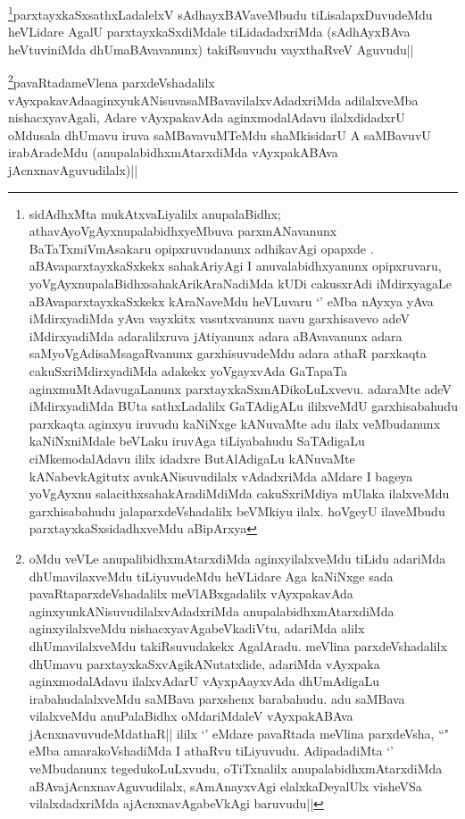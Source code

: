 \begin{artha}
\footnote{sidAdhxMta mukAtxvaLiyalilx anupalaBidhx; athavAyoVgAyxnupalabidhxyeMbuva parxmANavanunx BaTaTxmiVmAsakaru opipxruvudanunx adhikavAgi opapxde . aBAvaparxtayxkaSxkekx sahakAriyAgi I anuvalabidhxyanunx opipxruvaru, yoVgAyxnupalaBidhxsahakArikAraNadiMda kUDi cakusxrAdi iMdirxyagaLe aBAvaparxtayxkaSxkekx  kAraNaveMdu heVLuvaru `\stext' eMba nAyxya yAva iMdirxyadiMda yAva vayxkitx vasutxvanunx navu garxhisavevo adeV iMdirxyadiMda adaralilxruva jAtiyanunx adara aBAvavanunx adara saMyoVgAdisaMsagaRvanunx garxhisuvudeMdu adara athaR parxkaqta cakuSxriMdirxyadiMda adakekx yoVgayxvAda GaTapaTa aginxmuMtAdavugaLanunx parxtayxkaSxmADikoLuLxvevu. adaraMte adeV iMdirxyadiMda BUta sathxLadalilx GaTAdigALu ililxveMdU garxhisabahudu parxkaqta aginxyu iruvudu kaNiNxge kANuvaMte adu ilalx veMbudanunx kaNiNxniMdale beVLaku iruvAga tiLiyabahudu  SaTAdigaLu ciMkemodalAdavu ililx idadxre ButAlAdigaLu kANuvaMte kANabevkAgitutx avukANisuvudilalx vAdadxriMda aMdare I bageya yoVgAyxnu salacithxsahakAradiMdiMda cakuSxriMdiya mUlaka ilalxveMdu garxhisabahudu jalaparxdeVshadalilx beVMkiyu ilalx. hoVgeyU ilaveMbudu parxtayxkaSxsidadhxveMdu aBipArxya}parxtayxkaSxsathxLadalelxV sAdhayxBAVaveMbudu tiLisalapxDuvudeMdu heVLidare AgalU parxtayxkaSxdiMdale tiLidadadxriMda (sAdhAyxBAva heVtuviniMda dhUmaBAvavanunx) takiRsuvudu vayxthaRveV Aguvudu||
\end{artha}

\begin{artha}
\footnote{oMdu veVLe anupalibidhxmAtarxdiMda aginxyilalxveMdu tiLidu adariMda dhUmavilaxveMdu tiLiyuvudeMdu heVLidare Aga kaNiNxge sada pavaRtaparxdeVshadalilx meVlABxgadalilx vAyxpakavAda aginxyunkANisuvudilalxvAdadxriMda anupalabidhxmAtarxdiMda aginxyilalxveMdu nishacxyavAgabeVkadiVtu, adariMda alilx dhUmavilalxveMdu takiRsuvudakekx AgalAradu.  meVlina parxdeVshadalilx dhUmavu parxtayxkaSxvAgikANutatxlide,  adariMda vAyxpaka aginxmodalAdavu ilalxvAdarU vAyxpAayxvAda dhUmAdigaLu irabahudalalxveMdu saMBava parxshenx barabahudu. adu saMBava vilalxveMdu anuPalaBidhx oMdariMdaleV vAyxpakABAva jAcnxnavuvudeMdathaR|| ililx `\stext' eMdare pavaRtada meVlina parxdeVsha, ``\stext" eMba amarakoVshadiMda I athaRvu tiLiyuvudu. AdipadadiMta `\stext' veMbudanunx tegedukoLuLxvudu, oTiTxnalilx anupalabidhxmAtarxdiMda aBAvajAcnxnavAguvudilalx, sAmAnayxvAgi elalxkaDeyalUlx visheVSa vilalxdadxriMda ajAcnxnavAgabeVkAgi baruvudu||}pavaRtadameVlena parxdeVshadalilx vAyxpakavAdaaginxyukANisuvasaMBavavilalxvAdadxriMda adilalxveMba nishacxyavAgali, Adare vAyxpakavAda aginxmodalAdavu ilalxdidadxrU oMdusala dhUmavu iruva saMBavavuMTeMdu shaMkisidarU A saMBavuvU irabAradeMdu (anupalabidhxmAtarxdiMda vAyxpakABAva jAcnxnavAguvudilalx)||
\end{artha}


